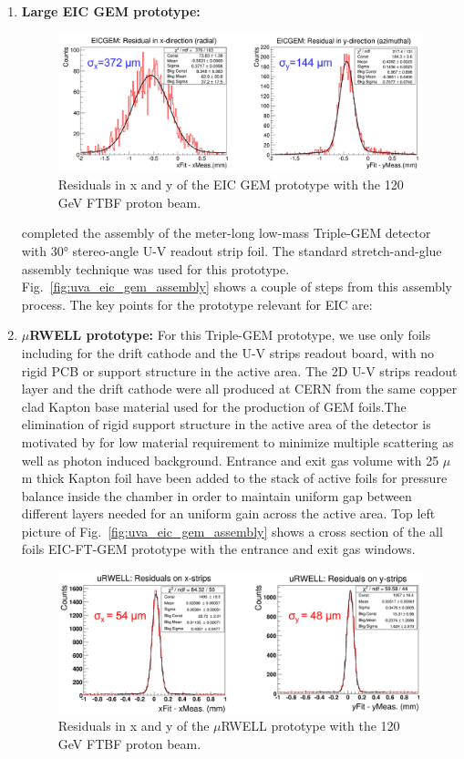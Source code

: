 \begin{enumerate}
\item \textbf{Large EIC GEM prototype:}
\begin{figure}[htb]
\centering
\includegraphics[width=1\columnwidth,trim={0pt 0mm 0pt 0mm},clip]{UVa_plots/eicResidual}
\caption{\label{fig:eicResidual} Residuals in x and y of the EIC GEM prototype with the 120 GeV FTBF proton beam.}
\end{figure}
%
completed the assembly of the meter-long low-mass Triple-GEM detector with \ang{30} stereo-angle U-V readout strip foil. The standard stretch-and-glue assembly technique was used for this prototype. Fig.~\ref{fig:uva_eic_gem_assembly} shows a couple of steps from this assembly process. The key points for the prototype relevant for EIC are:
%
\item \textbf{$\mu$RWELL prototype:}
%
For this Triple-GEM prototype, we use only foils including for the drift cathode and the U-V strips readout board, with no rigid PCB or support structure  in the active area. The 2D U-V strips readout layer and the drift cathode were all produced at CERN from the same copper clad Kapton base material used for the production of GEM foils.The elimination of rigid support structure in the active area of the detector is motivated by for low material requirement to minimize multiple scattering as well as photon induced background. Entrance and exit gas volume with 25 $\mu$m thick Kapton foil have been added to the stack of active foils for pressure balance inside the chamber in order to maintain uniform gap between different layers needed for an uniform gain across the active area.  Top left picture of Fig.~\ref{fig:uva_eic_gem_assembly} shows a cross section of the all foils EIC-FT-GEM prototype with the entrance and exit gas windows.
%
\begin{figure}[htb]
\centering
\includegraphics[width=1\columnwidth,trim={0pt 0mm 0pt 0mm},clip]{UVa_plots/uRwellResidual}
\caption{\label{fig:uRwellResidual} Residuals in x and y of the $\mu$RWELL prototype with the 120 GeV FTBF proton beam.}
\end{figure}
%
\end{enumerate}
